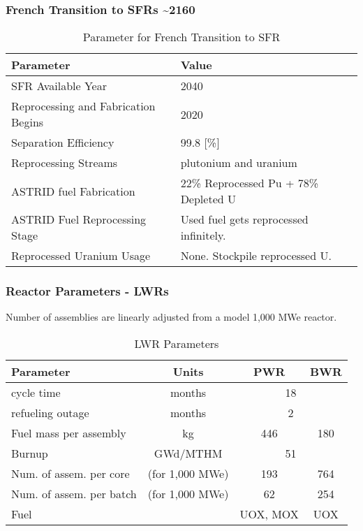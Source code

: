 \begin{frame}
    \frametitle{French Transition to SFRs \textasciitilde 2160}
    
\begin{table}[h]
    \centering
    \begin{tabularx}{\textwidth}{bb}
        \hline
        Parameter & Value \\
        \hline
        \gls{SFR} Available Year & 2040 \\
        Reprocessing and Fabrication Begins & 2020 \\
        Separation Efficiency & 99.8 [\%] \\
        Reprocessing Streams & plutonium and uranium \\
        ASTRID fuel Fabrication &  \small{22\% Reprocessed Pu + 78\% Depleted U}  \\
        ASTRID Fuel Reprocessing Stage &  Used fuel gets reprocessed infinitely. \\
        Reprocessed Uranium Usage &  None. Stockpile reprocessed U. \\
        \hline
    \end{tabularx}
    \caption {Parameter for French Transition to \gls{SFR}}
    \label{tab:sim_france}
\end{table}

\end{frame}


\begin{frame}
    \frametitle{Reactor Parameters - \glspl{LWR} }
    Number of assemblies are linearly adjusted from a model 1,000 MWe reactor.
    \begin{table}[h]
    \centering
    \begin{tabularx}{\textwidth}{bccc}
        \hline
        Parameter & Units & PWR \cite{sutharshan_ap1000tm_2011} & BWR \cite{hinds_next-generation_2006} \\
        \hline
        cycle time & months & \multicolumn{2}{c}{18}   \\ 
        refueling outage & months & \multicolumn{2}{c}{2}\\
        Fuel mass per assembly & kg & 446 & 180 \\
        Burnup & GWd/MTHM & \multicolumn{2}{c}{51} \\
        \small{Num. of assem. per core} & (for 1,000 MWe) & 193  & 764 \\
        \small{Num. of assem. per batch} & (for 1,000 MWe) & 62 & 254 \\
        Fuel & & \gls{UOX}, \gls{MOX} & \gls{UOX}  \\
        \hline
    \end{tabularx}
    \caption {\gls{LWR} Parameters}
    \label{tab:lwr}
    \end{table}
\end{frame}


